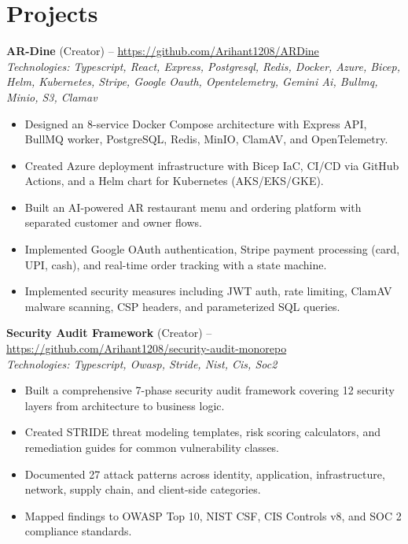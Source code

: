 \documentclass[11pt,a4paper]{article}
\begin{document}
\section{Projects}
\textbf{AR-Dine} (Creator) -- \href{https://github.com/Arihant1208/ARDine}{https://github.com/Arihant1208/ARDine}
\\ \textit{Technologies: Typescript, React, Express, Postgresql, Redis, Docker, Azure, Bicep, Helm, Kubernetes, Stripe, Google Oauth, Opentelemetry, Gemini Ai, Bullmq, Minio, S3, Clamav}
\begin{itemize}
  \item Designed an 8-service Docker Compose architecture with Express API, BullMQ worker, PostgreSQL, Redis, MinIO, ClamAV, and OpenTelemetry.
  \item Created Azure deployment infrastructure with Bicep IaC, CI/CD via GitHub Actions, and a Helm chart for Kubernetes (AKS/EKS/GKE).
  \item Built an AI-powered AR restaurant menu and ordering platform with separated customer and owner flows.
  \item Implemented Google OAuth authentication, Stripe payment processing (card, UPI, cash), and real-time order tracking with a state machine.
  \item Implemented security measures including JWT auth, rate limiting, ClamAV malware scanning, CSP headers, and parameterized SQL queries.
\end{itemize}
\vspace{2pt}
\textbf{Security Audit Framework} (Creator) -- \href{https://github.com/Arihant1208/security-audit-monorepo}{https://github.com/Arihant1208/security-audit-monorepo}
\\ \textit{Technologies: Typescript, Owasp, Stride, Nist, Cis, Soc2}
\begin{itemize}
  \item Built a comprehensive 7-phase security audit framework covering 12 security layers from architecture to business logic.
  \item Created STRIDE threat modeling templates, risk scoring calculators, and remediation guides for common vulnerability classes.
  \item Documented 27 attack patterns across identity, application, infrastructure, network, supply chain, and client-side categories.
  \item Mapped findings to OWASP Top 10, NIST CSF, CIS Controls v8, and SOC 2 compliance standards.
\end{itemize}
\end{document}
